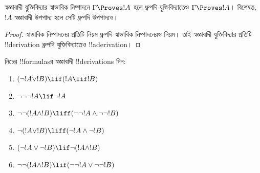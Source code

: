 \documentclass[../../../include/open-logic-section]{subfiles}
\begin{document}
\begin{prop}
  স্বজ্ঞাবাদী যুক্তিবিদ্যার স্বাভাবিক নিষ্পাদনে $\Gamma \Proves !A$
  হলে ধ্রুপদি যুক্তিবিদ্যাতেও $\Gamma \Proves !A$। বিশেষত, $!A$
  স্বজ্ঞাবাদী উপপাদ্য হলে সেটি ধ্রুপদি উপপাদ্যও।
\end{prop}

\begin{proof}
  স্বাভাবিক নিষ্পাদনের প্রতিটি নিয়ম ধ্রুপদি স্বাভাবিক নিষ্পাদনেরও
  নিয়ম। তাই স্বজ্ঞাবাদী যুক্তিবিদ্যার প্রতিটি !!{derivation} ধ্রুপদি
  যুক্তিবিদ্যাতেও !!a{derivation}।
\end{proof}

\begin{prob}
  নিচের !!{formula}sর স্বজ্ঞাবাদী !!{derivation}s দিন:
  \begin{enumerate}
    \item $(\lnot !A \lor !B) \lif (!A \lif !B)$
    \item $\lnot\lnot\lnot !A \lif \lnot !A$
    \item $\lnot\lnot (!A \land !B) \liff (\lnot\lnot !A\land \lnot \lnot !B)$
    \item $\lnot (!A \lor !B) \liff (\lnot !A \land \lnot !B)$
    \item $(\lnot !A \lor \lnot !B) \lif \lnot (!A \land !B)$
    \item $\lnot\lnot ( !A \land !B) \lif  (\lnot\lnot !A \lor
    \lnot\lnot !B)$
  \end{enumerate}
\end{prob}
\end{document}
